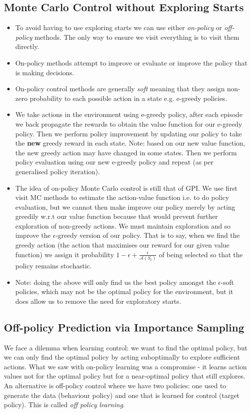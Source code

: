 \subsection{Monte Carlo Control without Exploring Starts}
\begin{itemize}
\item To avoid having to use exploring starts we can use either \textit{on-policy} or \textit{off-policy} methods. The only way to ensure we visit everything is to visit them directly.
\item On-policy methods attempt to improve or evaluate or improve the policy that is making decisions.
\item On-policy control methods are generally \textit{soft} meaning that they assign non-zero probability to each possible action in a state e.g. e-greedy policies.
\item We take actions in the environment using e-greedy policy, after each episode we back propagate the rewards to obtain the value function for our e-greedy policy. Then we perform policy improvement by updating our policy to take the \textbf{new} greedy reward in each state. Note: based on our new value function, the new greedy action may have changed in some states. Then we perform policy evaluation using our new e-greedy policy and repeat (as per generalised policy iteration).
\item The idea of on-policy Monte Carlo control is still that of GPI. We use first visit MC methods to estimate the action-value function i.e. to do policy evaluation, but we cannot then make improve our policy merely by acting greedily w.r.t our value function because that would prevent further exploration of non-greedy actions. We must maintain exploration and so improve the $\epsilon$-greedy version of our policy. That is to say, when we find the greedy action (the action that maximises our reward for our given value function) we assign it probability $1 - \epsilon + \frac{\epsilon}{\mathcal{A}(S_t)}$ of being selected so that the policy remains stochastic.
\item Note: doing the above will only find us the best policy amongst the $\epsilon$-soft policies, which may not be the optimal policy for the environment, but it does allow us to remove the need for exploratory starts.
\end{itemize}

\subsection{Off-policy Prediction via Importance Sampling}
We face a dilemma when learning control: we want to find the optimal policy, but we can only find the optimal policy by acting suboptimally to explore sufficient actions. What we saw with on-policy learning was a compromise - it learns action values not for the optimal policy but for a near-optimal policy that still explores. An alternative is off-policy control where we have two policies: one used to generate the data (behaviour policy) and one that is learned for control (target policy). This is called \textit{off policy learning}.

